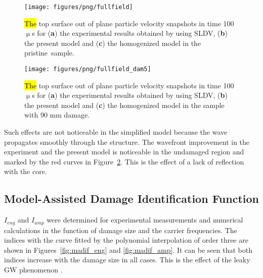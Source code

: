 \documentclass[sensors,article,accept,moreauthors,pdftex]{Definitions/mdpi}
\begin{document}
\begin{paracol}{2}
\vspace{-6pt}
\begin{figure}[H]
		\texttt{[image: figures/png/fullfield]}
	\caption{\hl{The} %
 top surface out of plane particle velocity snapshots in time 100 \(\upmu\)s for (\textbf{a}) the experimental results obtained by using SLDV, (\textbf{b}) the present model and (\textbf{c}) the homogenized model in the pristine~sample.}
	\label{fig:wavefield}
\end{figure}
\begin{figure}[H]
		\texttt{[image: figures/png/fullfield\_dam5]}
	\caption{\hl{The} %
 top surface out of plane particle velocity snapshots in time 100~\(\upmu\)s for (\textbf{a}) the experimental results obtained by using SLDV, (\textbf{b}) the present model and (\textbf{c}) the homogenized model in the sample with 90 mm damage.}
	\label{fig:wavefield_dam5}
\end{figure}

Such  effects are not noticeable in the simplified model because the wave propagates smoothly through the structure.
The wavefront improvement in the experiment and the present model is noticeable in the undamaged region and marked by the red curves in Figure~\ref{fig:wavefield_dam5}.
This is the effect of a lack of reflection with the core.

\subsection{Model-Assisted Damage Identification Function}
\label{MADIF}



\(I_{eng}\) and \(I_{amp}\) were determined for experimental measurements and numerical calculations in the function of damage size and the carrier frequencies.
The indices with the curve fitted by the polynomial interpolation of order three are shown in  Figures~\ref{fig:madif_eng} and \ref{fig:madif_amp}.
It can be seen that both indices increase with the damage size in all cases.
This is the effect of the leaky GW phenomenon \cite{song2009guided}.


\end{paracol}
\end{document}
